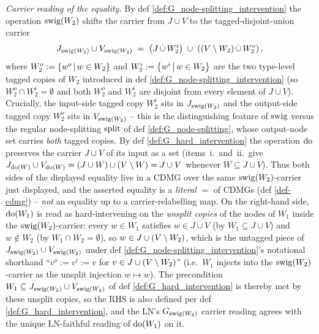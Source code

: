 \documentclass[main]{subfiles}
\begin{document}
\begin{Lem}
    \medskip\emph{Carrier reading of the equality.}
    By def \ref{def:G_node-splitting_intervention} the operation $\mathrm{swig}(W_2)$ shifts the carrier from $J \cup V$ to the tagged-disjoint-union carrier
    \[ J_{\mathrm{swig}(W_2)} \cup V_{\mathrm{swig}(W_2)} \;=\; \left ( J \,\dot{\cup}\, W_2^i \right ) \;\cup\; \left ( (V \setminus W_2) \,\dot{\cup}\, W_2^o \right ), \]
    where $W_2^o := \left \{ w^o \,\middle|\, w \in W_2 \right \}$ and $W_2^i := \left \{ w^i \,\middle|\, w \in W_2 \right \}$ are the two type-level tagged copies of $W_2$ introduced in def \ref{def:G_node-splitting_intervention} (so $W_2^o \cap W_2^i = \emptyset$ and both $W_2^o$ and $W_2^i$ are disjoint from every element of $J \cup V$). Crucially, the input-side tagged copy $W_2^i$ sits in $J_{\mathrm{swig}(W_2)}$ and the output-side tagged copy $W_2^o$ sits in $V_{\mathrm{swig}(W_2)}$ -- this is the distinguishing feature of $\mathrm{swig}$ versus the regular node-splitting $\mathrm{split}$ of def \ref{def:G_node-splitting}, whose output-node set carries \emph{both} tagged copies. By def \ref{def:G_hard_intervention} the operation $\operatorname{do}$ preserves the carrier $J \cup V$ of its input as a set (items~i.\ and~ii.\ give $J_{\operatorname{do}(W)} \cup V_{\operatorname{do}(W)} = (J \cup W) \cup (V \setminus W) = J \cup V$ whenever $W \subseteq J \cup V$). Thus both sides of the displayed equality live in a CDMG over the same $\mathrm{swig}(W_2)$-carrier just displayed, and the asserted equality is a \emph{literal} $=$ of CDMGs (def \ref{def-cdmg}) -- \emph{not} an equality up to a carrier-relabelling map. On the right-hand side, $\operatorname{do}(W_1)$ is read as hard-intervening on the \emph{unsplit copies} of the nodes of $W_1$ inside the $\mathrm{swig}(W_2)$-carrier: every $w \in W_1$ satisfies $w \in J \cup V$ (by $W_1 \subseteq J \cup V$) and $w \notin W_2$ (by $W_1 \cap W_2 = \emptyset$), so $w \in J \cup (V \setminus W_2)$, which is the untagged piece of $J_{\mathrm{swig}(W_2)} \cup V_{\mathrm{swig}(W_2)}$ under def \ref{def:G_node-splitting_intervention}'s notational shorthand ``$v^o := v^i := v$ for $v \in J \cup (V \setminus W_2)$'' (i.e.\ $W_1$ injects into the $\mathrm{swig}(W_2)$-carrier as the unsplit injection $w \mapsto w$). The precondition $W_1 \subseteq J_{\mathrm{swig}(W_2)} \cup V_{\mathrm{swig}(W_2)}$ of def \ref{def:G_hard_intervention} is thereby met by these unsplit copies, so the RHS is also defined per def \ref{def:G_hard_intervention}, and the LN's $G_{\mathrm{swig}(W_2)}$ carrier reading agrees with the unique LN-faithful reading of $\operatorname{do}(W_1)$ on it.
\end{Lem}
\end{document}
